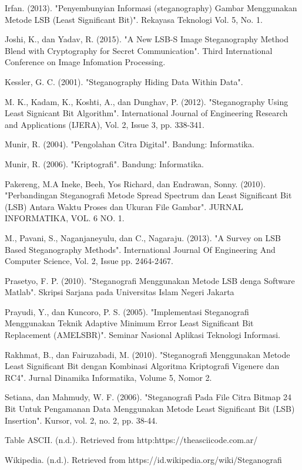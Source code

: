 \documentclass{jtetiskripsi}
\begin{document}
\begin{thebibliography}{99}
	Irfan. (2013). "Penyembunyian Informasi (steganography) Gambar Menggunakan Metode LSB (Least Significant Bit)". Rekayasa Teknologi Vol. 5, No. 1.
	
	Joshi, K., dan Yadav, R. (2015). "A New LSB-S Image Steganography Method Blend with Cryptography for Secret Communication". Third International Conference on Image Infomation Processing.
	
	Kessler, G. C. (2001). "Steganography Hiding Data Within Data".
	
	M. K., Kadam, K., Koshti, A., dan Dunghav, P. (2012). "Steganography Using Least Signicant Bit Algorithm". International Journal of Engineering Research and Applications (IJERA), Vol. 2, Issue 3, pp. 338-341.
	
	Munir, R. (2004). "Pengolahan Citra Digital". Bandung: Informatika.
	
	Munir, R. (2006). "Kriptografi". Bandung: Informatika.
	
	Pakereng, M.A Ineke, Beeh, Yos Richard, dan Endrawan, Sonny. (2010). "Perbandingan Steganografi Metode Spread Spectrum dan Least Significant Bit (LSB) Antara Waktu Proses dan Ukuran File Gambar". JURNAL INFORMATIKA, VOL. 6 NO. 1.
	
	M., Pavani, S., Naganjaneyulu, dan C., Nagaraju. (2013). "A Survey on LSB Based Steganography Methods". International Journal Of Engineering And Computer Science, Vol. 2, Issue pp. 2464-2467.
	
	Prasetyo, F. P. (2010). "Steganografi Menggunakan Metode LSB denga Software Matlab". Skripsi Sarjana pada Universitas Islam Negeri Jakarta
	
	Prayudi, Y., dan Kuncoro, P. S. (2005). "Implementasi Steganografi Menggunakan Teknik Adaptive Minimum Error Least Significant Bit Replacement (AMELSBR)". Seminar Nasional Aplikasi Teknologi Informasi.
	
	Rakhmat, B., dan Fairuzabadi, M. (2010). "Steganografi Menggunakan Metode Least Significant Bit dengan Kombinasi Algoritma Kriptografi Vigenere dan RC4". Jurnal Dinamika Informatika, Volume 5, Nomor 2.
	
	Setiana, dan Mahmudy, W. F. (2006). "Steganografi Pada File Citra Bitmap 24 Bit Untuk Pengamanan Data Menggunakan Metode Least Significant Bit (LSB) Insertion". Kursor, vol. 2, no. 2, pp. 38-44.
	
	Table ASCII. (n.d.). Retrieved from http:https://theasciicode.com.ar/
	
	Wikipedia. (n.d.). Retrieved from https://id.wikipedia.org/wiki/Steganografi
		
		
	
\end{thebibliography}

%

%
\end{document}
